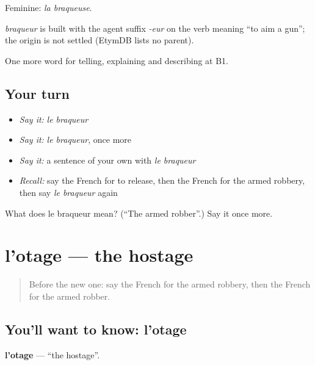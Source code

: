 Feminine: \emph{la braqueuse}.

\begin{cousinweb}
\emph{braqueur} is built with the agent suffix \emph{-eur} on the verb meaning \textquotedblleft{}to aim a gun\textquotedblright{}; the origin is not settled (EtymDB lists no parent).
\end{cousinweb}

\begin{grammarlens}[title={What you've built}]
One more word for telling, explaining and describing at B1.
\end{grammarlens}

\subsection*{Your turn}
\begin{itemize}
\raggedright
  \item \emph{Say it:} \emph{le braqueur}
  \item \emph{Say it:} \emph{le braqueur}, once more
  \item \emph{Say it:} a sentence of your own with \emph{le braqueur}
  \item \emph{Recall:} say the French for to release, then the French for the armed robbery, then say \emph{le braqueur} again
\end{itemize}

\begin{tcolorbox}[breakable,colback=teal!4,colframe=teal!35!black,title={Before you move on}]
What does le braqueur mean? (\textquotedblleft{}The armed robber\textquotedblright{}.) Say it once more.
\end{tcolorbox}
\section[l'otage]{l'otage — the hostage}

\label{lesson:FR-C296-otage}



\begin{quote}
Before the new one: say the French for the armed robbery, then the French for the armed robber.
\end{quote}

\subsection*{You'll want to know: l'otage}
\textbf{l'otage} — \textquotedblleft{}the hostage\textquotedblright{}.

